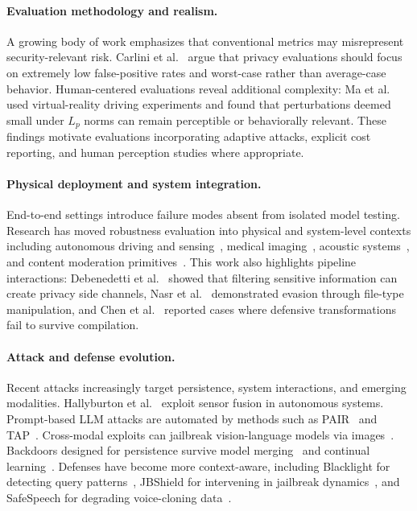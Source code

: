 \documentclass[11pt,a4paper]{article}
\begin{document}
\paragraph{Evaluation methodology and realism.}
A growing body of work emphasizes that conventional metrics may misrepresent security-relevant risk. Carlini et al.~\citep{carlini2022membership} argue that privacy evaluations should focus on extremely low false-positive rates and worst-case rather than average-case behavior. Human-centered evaluations reveal additional complexity: Ma et al.~\citep{ma2024avara} used virtual-reality driving experiments and found that perturbations deemed small under $L_p$ norms can remain perceptible or behaviorally relevant. These findings motivate evaluations incorporating adaptive attacks, explicit cost reporting, and human perception studies where appropriate.

\paragraph{Physical deployment and system integration.}
End-to-end settings introduce failure modes absent from isolated model testing. Research has moved robustness evaluation into physical and system-level contexts including autonomous driving and sensing~\citep{jia2022physical, cao2023lidar, kobayashi2025shadow}, medical imaging~\citep{liu2023xadv}, acoustic systems~\citep{ahmed2023tubes}, and content moderation primitives~\citep{zhang2025atkscopes}. This work also highlights pipeline interactions: Debenedetti et al.~\citep{debenedetti2024privacy} showed that filtering sensitive information can create privacy side channels, Nasr et al.~\citep{nasr2025magika} demonstrated evasion through file-type manipulation, and Chen et al.~\citep{chen2023obsan} reported cases where defensive transformations fail to survive compilation.

\paragraph{Attack and defense evolution.}
Recent attacks increasingly target persistence, system interactions, and emerging modalities. Hallyburton et al.~\citep{hallyburton2022frustum} exploit sensor fusion in autonomous systems. Prompt-based LLM attacks are automated by methods such as PAIR~\citep{chao2023jailbreaking} and TAP~\citep{mehrotra2024tree}. Cross-modal exploits can jailbreak vision-language models via images~\citep{qi2024visual}. Backdoors designed for persistence survive model merging~\citep{wang2025mergebackdoor} and continual learning~\citep{guo2025persistent}. Defenses have become more context-aware, including Blacklight for detecting query patterns~\citep{li2022blacklight}, JBShield for intervening in jailbreak dynamics~\citep{zhang2025jbshield}, and SafeSpeech for degrading voice-cloning data~\citep{zhang2025safespeech}.
\end{document}

